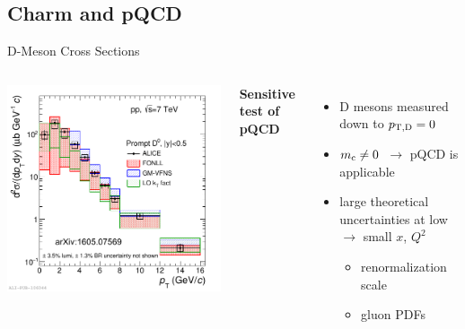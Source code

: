 \documentclass[xcolor={usenames,dvipsnames}]{beamer}
\begin{document}
\subsection{Charm and pQCD}
\begin{frame}{D-Meson Cross Sections}
\begin{columns}
\includegraphics[width=\textwidth]{img/ALICE_D0Meson}

\textbf{\alert{Sensitive test of pQCD}}
\begin{itemize}
\item D mesons measured down to \alert{$p_{\mathrm{T,D}}=0$~\GeVc}
\item \alert{$m_{\rm c} \neq 0$}~$\rightarrow$ pQCD is applicable
\item large theoretical uncertainties at low \ptd $\rightarrow$ \alert{small $x$, $Q^2$}
\begin{itemize}
\item renormalization scale
\item gluon PDFs
\end{itemize}
\end{itemize}
\end{columns}
\end{frame}
\end{document}
